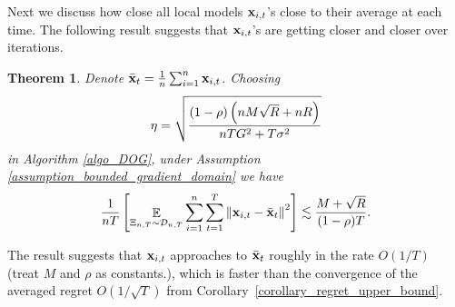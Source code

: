 \documentclass{article}
\newtheorem{Theorem}{\bf{Theorem}}
\begin{document}
Next we discuss how close all local models ${\bf x}_{i,t}$'s close to their average at each time. The following result suggests that ${\bf x}_{i,t}$'s are getting closer and closer over iterations.
\begin{Theorem}
\label{theorem_local_models_closer}
Denote $\bar{{\bf x}}_t = \frac{1}{n}\sum_{i=1}^n {\bf x}_{i,t}$.
Choosing 
\begin{align}
\nonumber
\eta = \sqrt{\frac{(1-\rho) \left( nM\sqrt{R} + nR \right)}{ nTG^2 + T\sigma^2 }}
\end{align} in Algorithm \ref{algo_DOG}, under Assumption \ref{assumption_bounded_gradient_domain} we have 
\begin{align}
\nonumber
{1\over nT}\left[\mathop{\mathbb{E}}_{ \Xi_{n,T} \sim \mathcal{D}_{n,T} } \sum_{i=1}^n\sum_{t=1}^T \left\lVert{\bf x}_{i,t} - \bar{{\bf x}}_t\right\rVert^2\right] \lesssim \frac{M + \sqrt{R}}{(1-\rho)T}.
\end{align}
\end{Theorem}
The result suggests that ${\bf x}_{i,t}$ approaches to $\bar{{\bf x}}_t$ roughly in the rate $O(1/{T})$ (treat $M$ and $\rho$ as constants.), which is faster than the convergence of the averaged regret $O(1/\sqrt{T})$ from Corollary~\ref{corollary_regret_upper_bound}. 
\end{document}
